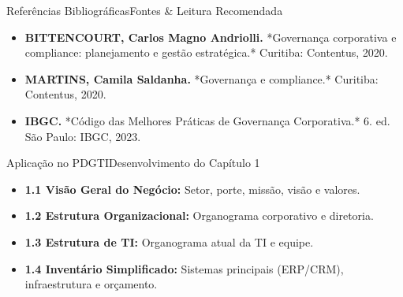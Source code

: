 \begin{senaiframe}{Referências Bibliográficas}{Fontes \& Leitura Recomendada}
  \vspace{0.5cm}
  \begin{tcolorbox}[senaicard, title={Obras de Referência}]
    \begin{itemize}
      \item \textbf{BITTENCOURT, Carlos Magno Andriolli.} *Governança corporativa e compliance: planejamento e gestão estratégica.* Curitiba: Contentus, 2020.
      \item \textbf{MARTINS, Camila Saldanha.} *Governança e compliance.* Curitiba: Contentus, 2020.
      \item \textbf{IBGC.} *Código das Melhores Práticas de Governança Corporativa.* 6. ed. São Paulo: IBGC, 2023.
    \end{itemize}
  \end{tcolorbox}
\end{senaiframe}

\begin{senaiframe}{Aplicação no PDGTI}{Desenvolvimento do Capítulo 1}
  \vspace{0.5cm}
  \begin{tcolorbox}[senaigreencard, title={Capítulo 1 – Caracterização da Organização}]
    \begin{itemize}
      \item \textbf{1.1 Visão Geral do Negócio:} Setor, porte, missão, visão e valores.
      \item \textbf{1.2 Estrutura Organizacional:} Organograma corporativo e diretoria.
      \item \textbf{1.3 Estrutura de TI:} Organograma atual da TI e equipe.
      \item \textbf{1.4 Inventário Simplificado:} Sistemas principais (ERP/CRM), infraestrutura e orçamento.
    \end{itemize}
  \end{tcolorbox}
\end{senaiframe}
